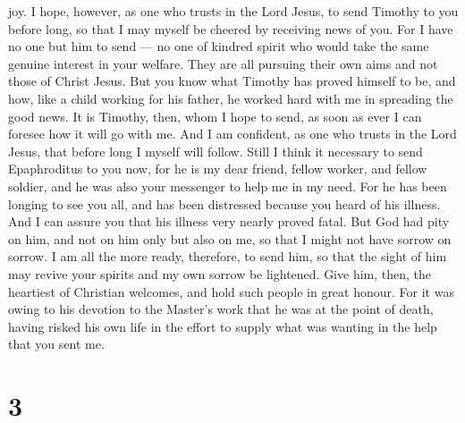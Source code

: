 joy.  I hope, however, as one who trusts in the Lord Jesus,
to send Timothy to you before long, so that I may myself be cheered by
receiving news of you.  For I have no one but him to send
--- no one of kindred spirit who would take the same genuine interest in
your welfare.  They are all pursuing their own aims and not
those of Christ Jesus.  But you know what Timothy has
proved himself to be, and how, like a child working for his father, he
worked hard with me in spreading the good news.  It is
Timothy, then, whom I hope to send, as soon as ever I can foresee how it
will go with me.  And I am confident, as one who trusts in
the Lord Jesus, that before long I myself will follow. 
Still I think it necessary to send Epaphroditus to you now, for he is my
dear friend, fellow worker, and fellow soldier, and he was also your
messenger to help me in my need.  For he has been longing
to see you all, and has been distressed because you heard of his
illness.  And I can assure you that his illness very nearly
proved fatal. But God had pity on him, and not on him only but also on
me, so that I might not have sorrow on sorrow.  I am all
the more ready, therefore, to send him, so that the sight of him may
revive your spirits and my own sorrow be lightened.  Give
him, then, the heartiest of Christian welcomes, and hold such people in
great honour.  For it was owing to his devotion to the
Master's work that he was at the point of death, having risked his own
life in the effort to supply what was wanting in the help that you sent
me.

\hypertarget{section-2}{%
\section{3}\label{section-2}}

